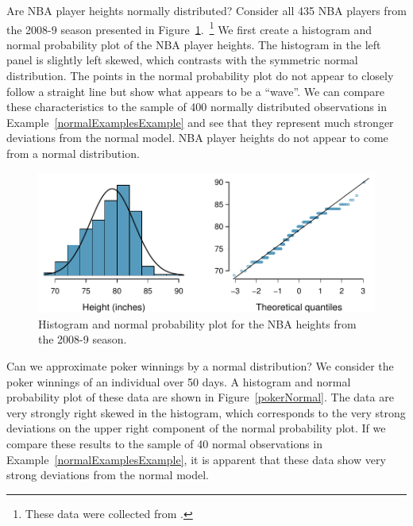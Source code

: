\begin{example}{Are NBA player heights normally distributed? Consider all 435 NBA players from the 2008-9 season presented in Figure~\ref{nbaNormal}.~\footnote{These data were collected from .}}
We first create a histogram and normal probability plot of the NBA player heights. The histogram in the left panel is slightly left skewed, which contrasts with the symmetric normal distribution. The points in the normal probability plot do not appear to closely follow a straight line but show what appears to be a ``wave''. We can compare these characteristics to the sample of 400 normally distributed observations in Example~\ref{normalExamplesExample} and see that they represent much stronger deviations from the normal model. NBA player heights do not appear to come from a normal distribution.
\end{example}

\begin{figure}
\centering
\includegraphics[width=\textwidth]{02/figures/nbaNormal/nbaNormal}
\caption{Histogram and normal probability plot for the NBA heights from the 2008-9 season.}
\label{nbaNormal}
\end{figure}

\textPE{\pagebreak}

\begin{example}{Can we approximate poker winnings by a normal distribution? We consider the poker winnings of an individual over 50 days. A histogram and normal probability plot of these data are shown in Figure~\ref{pokerNormal}.}
The data are very strongly right skewed in the histogram, which corresponds to the very strong deviations on the upper right component of the normal probability plot. If we compare these results to the sample of 40 normal observations in Example~\ref{normalExamplesExample}, it is apparent that these data show very strong deviations from the normal model.
\end{example}

